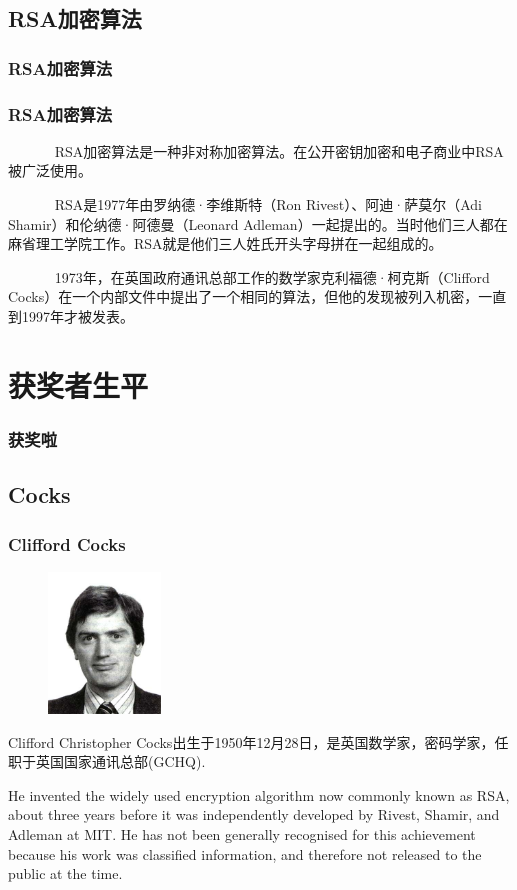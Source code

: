\documentclass[slidestop,compress,mathserif]{beamer}
\begin{document}
\subsection{\hfill RSA加密算法}
\begin{frame}
  \frametitle{RSA加密算法}
\end{frame}
\begin{frame}
  \frametitle{RSA加密算法}
~ ~ ~ ~ RSA加密算法是一种非对称加密算法。在公开密钥加密和电子商业中RSA被广泛使用。

~ ~ ~ ~ RSA是1977年由罗纳德·李维斯特（Ron Rivest）、阿迪·萨莫尔（Adi Shamir）和伦纳德·阿德曼（Leonard Adleman）一起提出的。当时他们三人都在麻省理工学院工作。RSA就是他们三人姓氏开头字母拼在一起组成的。

~ ~ ~ ~ 1973年，在英国政府通讯总部工作的数学家克利福德·柯克斯（Clifford Cocks）在一个内部文件中提出了一个相同的算法，但他的发现被列入机密，一直到1997年才被发表。

\end{frame}

\section{获奖者生平}

\begin{frame}
  \frametitle{获奖啦}

\end{frame}


\subsection{\hfill Cocks}
\begin{frame}
  \frametitle{Clifford Cocks}
  
  \begin{multicols}{2}
    \begin{figure}
      \includegraphics[width=3cm]{Cocks.jpg}
    \end{figure}
    Clifford Christopher Cocks出生于1950年12月28日，是英国数学家，密码学家，任职于英国国家通讯总部(GCHQ).
    
    He invented the widely used encryption algorithm now commonly known as RSA, about three years before it was independently developed by Rivest, Shamir, and Adleman at MIT. He has not been generally recognised for this achievement because his work was classified information, and therefore not released to the public at the time.

    
  \end{multicols}
  
\end{frame}
\end{document}
